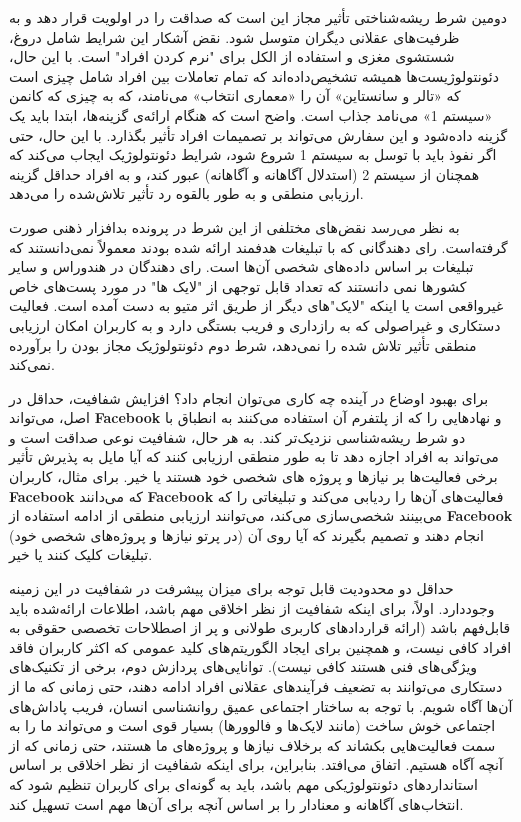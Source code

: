 دومین شرط ریشه‌شناختی تأثیر مجاز این است که صداقت را در اولویت قرار دهد و به ظرفیت‌های عقلانی دیگران متوسل شود.
نقض آشکار این شرایط شامل دروغ، شستشوی مغزی و استفاده از الکل برای "نرم کردن افراد" است.
با این حال، دئونتولوژیست‌ها همیشه تشخیص‌داده‌اند که تمام تعاملات بین افراد شامل چیزی است که «تالر و سانستاین» آن را «معماری انتخاب» می‌نامند، که به چیزی که کانمن «سیستم 1» می‌نامد جذاب است.
واضح است که هنگام ارائه‌ی گزینه‌ها، ابتدا باید یک گزینه داده‌شود و این سفارش می‌تواند بر تصمیمات افراد تأثیر بگذارد.
با این حال، حتی اگر نفوذ باید با توسل به سیستم 1 شروع شود، شرایط دئونتولوژیک ایجاب می‌کند که همچنان از سیستم 2 (استدلال آگاهانه و آگاهانه) عبور کند، و به افراد حداقل گزینه ارزیابی منطقی و به طور بالقوه رد تأثیر تلاش‌شده را می‌دهد.

به نظر می‌رسد نقض‌های مختلفی از این شرط در پرونده بدافزار ذهنی صورت گرفته‌است.
رای دهندگانی که با تبلیغات هدفمند ارائه شده بودند معمولاً نمی‌دانستند که تبلیغات بر اساس داده‌های شخصی آن‌ها است.
رای دهندگان در هندوراس و سایر کشورها نمی دانستند که تعداد قابل توجهی از "لایک ها" در مورد پست‌های خاص غیرواقعی است یا اینکه "لایک"‌های دیگر از طریق اثر متیو به دست آمده است.
فعالیت دستکاری و غیراصولی که به رازداری و فریب بستگی دارد و به کاربران امکان ارزیابی منطقی تأثیر تلاش شده را نمی‌دهد، شرط دوم دئونتولوژیک مجاز بودن را برآورده نمی‌کند.

برای بهبود اوضاع در آینده چه کاری می‌توان انجام داد؟ افزایش شفافیت، حداقل در اصل، می‌تواند \textenglish{\textbf{Facebook}} و نهادهایی را که از پلتفرم آن استفاده می‌کنند به انطباق با دو شرط ریشه‌شناسی نزدیک‌تر کند.
به هر حال، شفافیت نوعی صداقت است و می‌تواند به افراد اجازه دهد تا به طور منطقی ارزیابی کنند که آیا مایل به پذیرش تأثیر برخی فعالیت‌ها بر نیازها و پروژه های شخصی خود هستند یا خیر.
برای مثال، کاربران \textenglish{\textbf{Facebook}} که می‌دانند \textenglish{\textbf{Facebook}} فعالیت‌های آن‌ها را ردیابی می‌کند و تبلیغاتی را که می‌بینند شخصی‌سازی می‌کند، می‌توانند ارزیابی منطقی از ادامه استفاده از \textenglish{\textbf{Facebook}} (در پرتو نیازها و پروژه‌های شخصی خود) انجام دهند و تصمیم بگیرند که آیا روی آن تبلیغات کلیک کنند یا خیر.

حداقل دو محدودیت قابل توجه برای میزان پیشرفت در شفافیت در این زمینه وجود‌دارد.
اولاً، برای اینکه شفافیت از نظر اخلاقی مهم باشد، اطلاعات ارائه‌شده باید قابل‌فهم باشد (ارائه قراردادهای کاربری طولانی و پر از اصطلاحات تخصصی حقوقی به افراد کافی نیست، و همچنین برای ایجاد الگوریتم‌های کلید عمومی که اکثر کاربران فاقد ویژگی‌های فنی هستند کافی نیست).
توانایی‌های پردازش دوم، برخی از تکنیک‌های دستکاری می‌توانند به تضعیف فرآیندهای عقلانی افراد ادامه دهند، حتی زمانی که ما از آن‌ها آگاه شویم.
با توجه به ساختار اجتماعی عمیق روانشناسی انسان، فریب پاداش‌های اجتماعی خوش ساخت (مانند لایک‌ها و فالوورها) بسیار قوی است و می‌تواند ما را به سمت فعالیت‌هایی بکشاند که برخلاف نیازها و پروژه‌های ما هستند، حتی زمانی که از آنچه آگاه هستیم.
اتفاق می‌افتد.
بنابراین، برای اینکه شفافیت از نظر اخلاقی بر اساس استانداردهای دئونتولوژیکی مهم باشد، باید به گونه‌ای برای کاربران تنظیم شود که انتخاب‌های آگاهانه و معنادار را بر اساس آنچه برای آن‌ها مهم است تسهیل کند.










